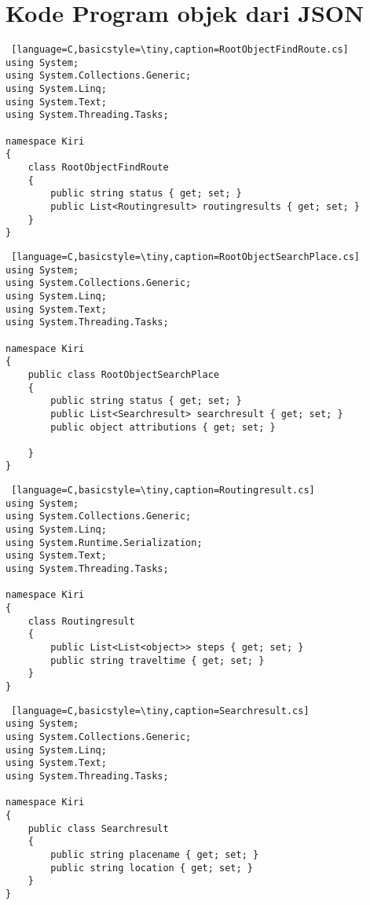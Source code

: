 \chapter{Kode Program objek dari JSON}
\label{app:G}

\singlespacing 
%
%

\begin{lstlisting} [language=C,basicstyle=\tiny,caption=RootObjectFindRoute.cs]
using System;
using System.Collections.Generic;
using System.Linq;
using System.Text;
using System.Threading.Tasks;

namespace Kiri
{
    class RootObjectFindRoute
    {
        public string status { get; set; }
        public List<Routingresult> routingresults { get; set; }
    }
}
\end{lstlisting}

\begin{lstlisting} [language=C,basicstyle=\tiny,caption=RootObjectSearchPlace.cs]
using System;
using System.Collections.Generic;
using System.Linq;
using System.Text;
using System.Threading.Tasks;

namespace Kiri
{
    public class RootObjectSearchPlace
    {
        public string status { get; set; }
        public List<Searchresult> searchresult { get; set; }
        public object attributions { get; set; }

    }
}
\end{lstlisting}

\begin{lstlisting} [language=C,basicstyle=\tiny,caption=Routingresult.cs]
using System;
using System.Collections.Generic;
using System.Linq;
using System.Runtime.Serialization;
using System.Text;
using System.Threading.Tasks;

namespace Kiri
{
    class Routingresult
    {
        public List<List<object>> steps { get; set; }
        public string traveltime { get; set; }        
    }
}
\end{lstlisting}

\begin{lstlisting} [language=C,basicstyle=\tiny,caption=Searchresult.cs]
using System;
using System.Collections.Generic;
using System.Linq;
using System.Text;
using System.Threading.Tasks;

namespace Kiri
{
    public class Searchresult
    {
        public string placename { get; set; }
        public string location { get; set; }
    }
}
\end{lstlisting}